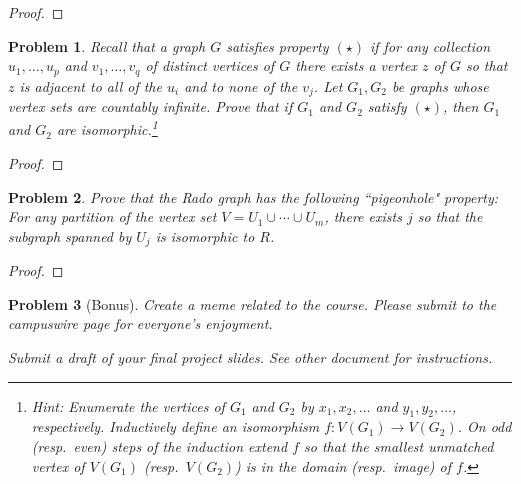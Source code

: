 \documentclass[11pt]{article}
\newtheorem{problem}{Problem}
\begin{document}
\begin{proof}

\end{proof}



\pagebreak

\begin{problem}
Recall that a graph $G$ satisfies property $(\star)$ if for any collection $u_1,\ldots,u_p$ and $v_1,\ldots,v_q$ of distinct vertices of $G$ there exists a vertex $z$ of $G$ so that $z$ is adjacent to all of the $u_i$ and to none of the $v_j$. Let $G_1,G_2$ be graphs whose vertex sets are countably infinite. Prove that if $G_1$ and $G_2$ satisfy $(\star)$, then $G_1$ and $G_2$ are isomorphic.\footnote{Hint: Enumerate the vertices of $G_1$ and $G_2$ by $x_1,x_2,\ldots$ and $y_1,y_2,\ldots$, respectively. Inductively define an isomorphism $f:V(G_1)\rightarrow V(G_2)$. On odd (resp.\ even) steps of the induction extend $f$ so that the smallest unmatched vertex of $V(G_1)$ (resp.\ $V(G_2)$) is in the domain (resp.\ image) of $f$.}
\end{problem}

\begin{proof}

\end{proof}

\pagebreak

\begin{problem}
Prove that the Rado graph has the following ``pigeonhole" property: For any partition of the vertex set $V=U_1\cup\cdots\cup U_m$, there exists $j$ so that the subgraph spanned by $U_j$ is isomorphic to $R$. 
\end{problem}

\begin{proof}

\end{proof}

\pagebreak


\begin{problem}[Bonus] Create a meme related to the course. Please submit to the campuswire page for everyone's enjoyment. 
\end{problem}

\pagebreak
{\it Submit a draft of your final project slides. See other document for instructions.} 
\end{document}
